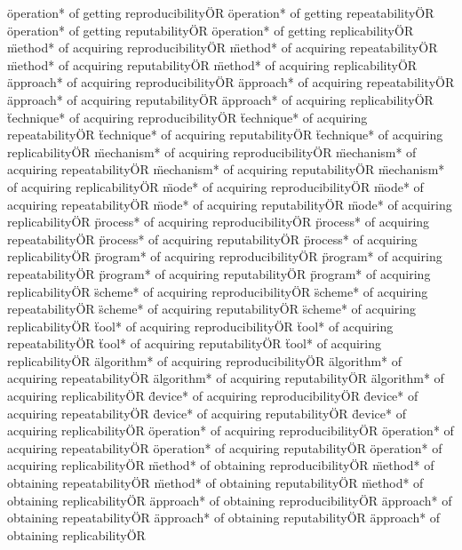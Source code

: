 \documentclass[
10pt, %
a4paper, %
oneside, %
headinclude,footinclude, %
BCOR5mm, %
]{scrartcl}
\begin{document}
\"operation* of getting reproducibility\" OR \"operation* of getting repeatability\" OR \"operation* of getting reputability\" OR \"operation* of getting replicability\" OR 
\"method* of acquiring reproducibility\" OR \"method* of acquiring repeatability\" OR \"method* of acquiring reputability\" OR \"method* of acquiring replicability\" OR 
\"approach* of acquiring reproducibility\" OR \"approach* of acquiring repeatability\" OR \"approach* of acquiring reputability\" OR \"approach* of acquiring replicability\" OR 
\"technique* of acquiring reproducibility\" OR \"technique* of acquiring repeatability\" OR \"technique* of acquiring reputability\" OR \"technique* of acquiring replicability\" OR 
\"mechanism* of acquiring reproducibility\" OR \"mechanism* of acquiring repeatability\" OR \"mechanism* of acquiring reputability\" OR \"mechanism* of acquiring replicability\" OR 
\"mode* of acquiring reproducibility\" OR \"mode* of acquiring repeatability\" OR \"mode* of acquiring reputability\" OR \"mode* of acquiring replicability\" OR 
\"process* of acquiring reproducibility\" OR \"process* of acquiring repeatability\" OR \"process* of acquiring reputability\" OR \"process* of acquiring replicability\" OR 
\"program* of acquiring reproducibility\" OR \"program* of acquiring repeatability\" OR \"program* of acquiring reputability\" OR \"program* of acquiring replicability\" OR 
\"scheme* of acquiring reproducibility\" OR \"scheme* of acquiring repeatability\" OR \"scheme* of acquiring reputability\" OR \"scheme* of acquiring replicability\" OR 
\"tool* of acquiring reproducibility\" OR \"tool* of acquiring repeatability\" OR \"tool* of acquiring reputability\" OR \"tool* of acquiring replicability\" OR 
\"algorithm* of acquiring reproducibility\" OR \"algorithm* of acquiring repeatability\" OR \"algorithm* of acquiring reputability\" OR \"algorithm* of acquiring replicability\" OR 
\"device* of acquiring reproducibility\" OR \"device* of acquiring repeatability\" OR \"device* of acquiring reputability\" OR \"device* of acquiring replicability\" OR 
\"operation* of acquiring reproducibility\" OR \"operation* of acquiring repeatability\" OR \"operation* of acquiring reputability\" OR \"operation* of acquiring replicability\" OR 
\"method* of obtaining reproducibility\" OR \"method* of obtaining repeatability\" OR \"method* of obtaining reputability\" OR \"method* of obtaining replicability\" OR 
\"approach* of obtaining reproducibility\" OR \"approach* of obtaining repeatability\" OR \"approach* of obtaining reputability\" OR \"approach* of obtaining replicability\" OR 
\end{document}

